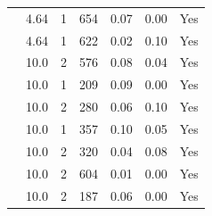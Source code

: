 \begin{longtable}{ | M{2.0cm} | M{2.0cm} | M{1.5cm} | M{1.5cm} | M{2.0cm} | M{2.0cm} | M{1.5cm} | }
                 & 4.64 & 1 & 654 & 0.07 & 0.00 & Yes \\
                 & 4.64 & 1 & 622 & 0.02 & 0.10 & Yes \\
                 & 10.0 & 2 & 576 & 0.08 & 0.04 & Yes \\
                 & 10.0 & 1 & 209 & 0.09 & 0.00 & Yes \\
                 & 10.0 & 2 & 280 & 0.06 & 0.10 & Yes \\
                 & 10.0 & 1 & 357 & 0.10 & 0.05 & Yes \\
                 & 10.0 & 2 & 320 & 0.04 & 0.08 & Yes \\
                 & 10.0 & 2 & 604 & 0.01 & 0.00 & Yes \\
                 & 10.0 & 2 & 187 & 0.06 & 0.00 & Yes \\
         \hline

\end{longtable}
